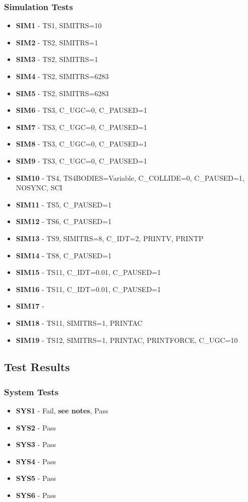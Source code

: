 \subsubsection{Simulation Tests}
\begin{itemize}
\footnotesize
\item \textbf{SIM1} - TS1, SIMITRS=10
\item \textbf{SIM2} - TS2, SIMITRS=1
\item \textbf{SIM3} - TS2, SIMITRS=1
\item \textbf{SIM4} - TS2, SIMITRS=6283
\item \textbf{SIM5} - TS2, SIMITRS=6283
\item \textbf{SIM6} - TS3, C\_UGC=0, C\_PAUSED=1
\item \textbf{SIM7} - TS3, C\_UGC=0, C\_PAUSED=1
\item \textbf{SIM8} - TS3, C\_UGC=0, C\_PAUSED=1
\item \textbf{SIM9} - TS3, C\_UGC=0, C\_PAUSED=1
\item \textbf{SIM10} - TS4, TS4BODIES=Variable, C\_COLLIDE=0, C\_PAUSED=1, NOSYNC, SCI
\item \textbf{SIM11} - TS5, C\_PAUSED=1
\item \textbf{SIM12} - TS6, C\_PAUSED=1
\item \textbf{SIM13} - TS9, SIMITRS=8, C\_IDT=2, PRINTV, PRINTP
\item \textbf{SIM14} - TS8, C\_PAUSED=1
\item \textbf{SIM15} - TS11, C\_IDT=0.01, C\_PAUSED=1
\item \textbf{SIM16} - TS11, C\_IDT=0.01, C\_PAUSED=1
\item \textbf{SIM17} - 
\item \textbf{SIM18} - TS11, SIMITRS=1, PRINTAC
\item \textbf{SIM19} - TS12, SIMITRS=1, PRINTAC, PRINTFORCE, C\_UGC=10
\end{itemize}

\pagebreak
\subsection{Test Results}
\subsubsection{System Tests}
\begin{itemize}
\footnotesize
\item \textbf{SYS1} - {\color{Red}Fail}, \textbf{see notes}, {\color{Green}Pass}
\item \textbf{SYS2} - {\color{Green}Pass}
\item \textbf{SYS3} - {\color{Green}Pass}
\item \textbf{SYS4} - {\color{Green}Pass}
\item \textbf{SYS5} - {\color{Green}Pass}
\item \textbf{SYS6} - {\color{Green}Pass}
\end{itemize}

